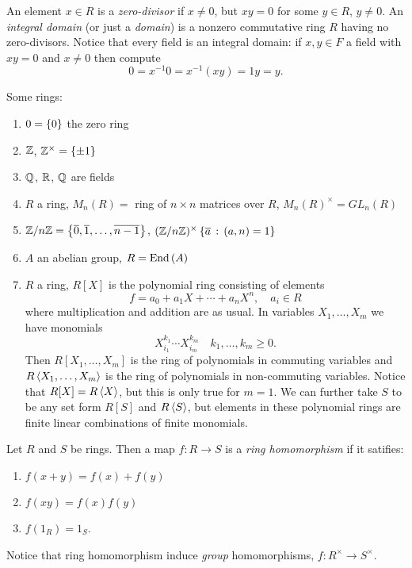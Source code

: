 An element $x \in R$ is a \emph{zero-divisor} if $x \neq 0$, but $xy = 0$ for some $y \in R$, $y \neq 0$. An \emph{integral domain} (or just a \emph{domain}) is a nonzero commutative ring $R$ having no zero-divisors. Notice that every field is an integral domain: if $x,y \in F$ a field with $xy = 0$ and $x \neq 0$ then compute
\[
0 = x^{-1} 0 = x^{-1} (xy) = 1 y = y.
\]
\begin{eg}
  Some rings:
  \begin{enumerate}
  \item $0 = \left\{0\right\}$ the zero ring
  \item $\mathbb{Z}$, $\mathbb{Z}^\times = \left\{\pm 1\right\}$
  \item $\mathbb{Q}$, $\mathbb{R}$, $\mathbb{Q}$ are fields
  \item $R$ a ring, $M_n(R) = $ ring of $n \times n$ matrices over $R$, $M_n(R)^\times = GL_n(R)$
  \item $\mathbb{Z} / n \mathbb{Z} = \left\{\overline{0}, \overline{1}, \ldots, \overline{n-1}\right\}$, $(\mathbb{Z} / n \mathbb{Z})^\times \left\{\overline{a} \,:\, (a,n)=1\right\}$
  \item $A$ an abelian group, $R = \mathrm{End}\,(A)$
  \item $R$ a ring, $R[X]$ is the polynomial ring consisting of elements
    \[
    f = a_0 + a_1 X + \cdots + a_n X^n, \quad a_i \in R
    \]
    where multiplication and addition are as usual. In variables $X_1, \ldots, X_m$ we have monomials
    \[
    X_{i_1}^{k_1} \cdots X_{i_m}^{k_m} \quad k_1, \ldots, k_m \geq 0.
    \]
    Then $R[X_1, \ldots, X_m]$ is the ring of polynomials in commuting variables and $R\left\langle X_1, \ldots, X_m \right\rangle$ is the ring of polynomials in non-commuting variables. Notice that $R[X] = R\left\langle X \right\rangle$, but this is only true for $m = 1$. We can further take $S$ to be any set form $R[S]$ and $R\left\langle S \right\rangle$, but elements in these polynomial rings are finite linear combinations of finite monomials.
  \end{enumerate}
\end{eg}

\begin{dfn}
  Let $R$ and $S$ be rings. Then a map $f : R \to S$ is a \emph{ring homomorphism} if it satifies:
  \begin{enumerate}
  \item $f(x + y) = f(x) + f(y)$
  \item $f(xy) = f(x)f(y)$
  \item $f(1_R) = 1_S$.
  \end{enumerate}
\end{dfn}

Notice that ring homomorphism induce \emph{group} homomorphisms, $f : R^\times \to S^\times$. 


